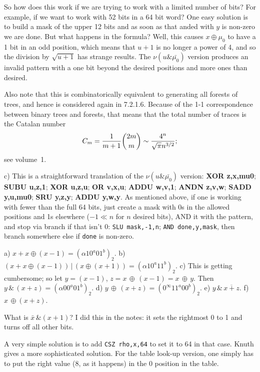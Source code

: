 So how does this work if we are trying to work with a limited number
of bits?  For example, if we want to work with 52 bits in a 64 bit word?
One easy solution is to build a mask of the upper 12 bits and as soon
as that anded with $y$ is non-zero we are done.  But what happens
in the formula?  Well, this causes $x \oplus \mu_0$ to have a 1 bit
in an odd position, which means that $u + 1$ is no longer a power of 4,
and so the division by $\sqrt{u+1}$ has strange results.  The 
$\nu\!\left(u \& \bar{\mu_0}\right)$ version produces an invalid pattern
with a one bit beyond the desired positions and more ones than desired.

Also note that this is combinatorically equivalent to generating
all forests of trees, and hence is considered again in 7.2.1.6.  Because
of the 1-1 correspondence between binary trees and forests, that
means that the total number of traces is the Catalan number
$$
  C_m = {1 \over m + 1} {2 m \choose m} \sim {4^n \over \sqrt{\pi} n^{3/2}};
$$
see volume~1.

\vskip 0.04in \noindent c) This is a straightforward translation of the $\nu\left(u \&
\bar{\mu_0}\right)$ version:
{\bf XOR z,x,mu0}; {\bf SUBU u,z,1}; {\bf XOR u,z,u}; {\bf OR v,x,u};
{\bf ADDU w,v,1}; {\bf ANDN z,v,w}; {\bf SADD y,u,mu0};
{\bf SRU y,z,y}; {\bf ADDU y,w,y}.  As mentioned above, if one is
working with fewer than the full 64 bits, just create a mask with 0s
in the allowed positions and 1s elsewhere ($-1 \ll n$ for $n$ desired bits),
AND it with the pattern, and stop via branch if that isn't 0:
{\tt SLU mask,-1,n}; {\tt AND done,y,mask}, then branch somewhere else if {\tt done} is
non-zero.

\vskip 0.08in  a) $x + x \oplus \left(x - 1\right) = 
\left(\alpha 1 0^a 0 1^b\right)_2$. b) $\left(x + x \oplus \left(x - 1\right)\right) \, | \, 
\left(x \oplus \left(x + 1\right)\right) = \left(\alpha 1 0^a 1 1^b\right)_2$.
c) This is getting cumbersome; so let $y = \left(x - 1\right)$, $z = x \, \oplus \, 
\left(x - 1\right) = x \, \oplus \, y$.  Then $y \, \& \, \left(x + z\right) =
\left(\alpha 0 0^a 0 1^b\right)_2$. d) $y \, \oplus \, \left(x + z \right) =
\left(0^{\infty} 1 1^a 0 0^b\right)_2$. e) $y \, \& \, \overline{x + z}$.
f) $x \, \oplus \left(x + z\right)$.

\vskip 0.08in  What is $\bar x \, \& \left(x + 1\right)$?
I did this in the notes: it sets the rightmost 0 to 1 and turns off all other bits.

\vskip 0.08in  A very simple solution is to add 
{\tt CSZ rho,x,64} to set it to 64 in that
case.  Knuth gives a more sophisticated solution.  For the table look-up
version, one simply has to put the right value (8, as it happens) 
in the 0 position in the table.

